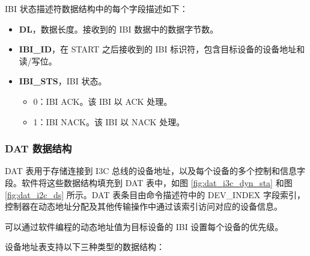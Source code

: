 \documentclass[main\_\_CN.tex]{subfiles}
\begin{document}
IBI 状态描述符数据结构中的每个字段描述如下：

\begin{itemize}
    \item \textbf{DL}，数据长度。接收到的 IBI 数据中的数据字节数。
    \item \textbf{IBI\_ID}，在 START 之后接收到的 IBI 标识符，包含目标设备的设备地址和读/写位。
    \item \textbf{IBI\_STS}，IBI 状态。
    \begin{itemize}
        \item 0：IBI ACK。该 IBI 以 ACK 处理。
        \item 1：IBI NACK。该 IBI 以 NACK 处理。
    \end{itemize}
\end{itemize}

\subsubsection{DAT 数据结构}

DAT 表用于存储连接到 I3C 总线的设备地址，以及每个设备的多个控制和信息字段。软件将这些数据结构填充到 DAT 表中，如图 \ref{fig:dat_i3c_dyn_sta} 和图 \ref{fig:dat_i2c_ds} 所示。DAT 表条目由命令描述符中的 DEV\_INDEX 字段索引，控制器在动态地址分配及其他传输操作中通过该索引访问对应的设备信息。

可以通过软件编程的动态地址值为目标设备的 IBI 设置每个设备的优先级。

设备地址表支持以下三种类型的数据结构：
\end{document}
